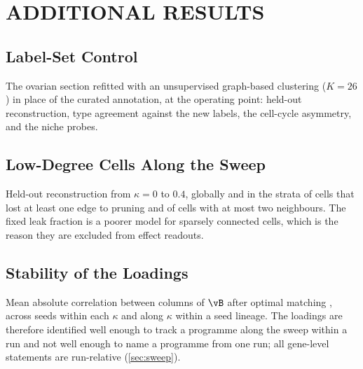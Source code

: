 \section{ADDITIONAL RESULTS}
\label{app:additional}


\subsection{Label-Set Control}
\label{app:graphclust}
The ovarian section refitted with an unsupervised graph-based clustering ($K = 26$) in place of the curated annotation, at the operating point: held-out reconstruction, type agreement against the new labels, the cell-cycle asymmetry, and the niche probes. 

\subsection{Low-Degree Cells Along the Sweep}
\label{app:low-degree}
Held-out reconstruction from $\kappa = 0$ to $0.4$, globally and in the strata of cells that lost at least one edge to pruning and of cells with at most two neighbours.  The fixed leak fraction is a poorer model for sparsely connected cells, which is the reason they are excluded from effect readouts.

\subsection{Stability of the Loadings}
\label{app:B-stability}
Mean absolute correlation between columns of $\vB$ after optimal matching \citep{kuhn1955}, across seeds within each $\kappa$ and along $\kappa$ within a seed lineage.  The loadings are therefore identified well enough to track a programme along the sweep within a run and not well enough to name a programme from one run; all gene-level statements are run-relative (\cref{sec:sweep}). 

